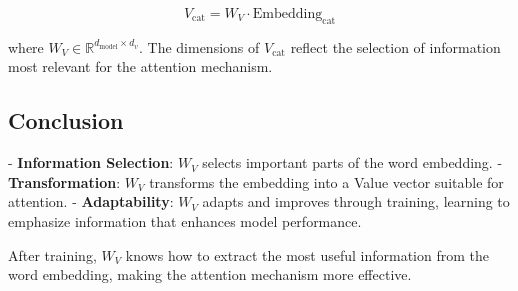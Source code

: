 \documentclass{article}
\begin{document}
\[
V_{\text{cat}} = W_V \cdot \text{Embedding}_{\text{cat}}
\]

where \( W_V \in \mathbb{R}^{d_{\text{model}} \times d_v} \). The dimensions of \( V_{\text{cat}} \) reflect the selection of information most relevant for the attention mechanism.

\subsection*{Conclusion}

- \textbf{Information Selection}: \( W_V \) selects important parts of the word embedding.
- \textbf{Transformation}: \( W_V \) transforms the embedding into a Value vector suitable for attention.
- \textbf{Adaptability}: \( W_V \) adapts and improves through training, learning to emphasize information that enhances model performance.
  
After training, \( W_V \) knows how to extract the most useful information from the word embedding, making the attention mechanism more effective.
\end{document}
